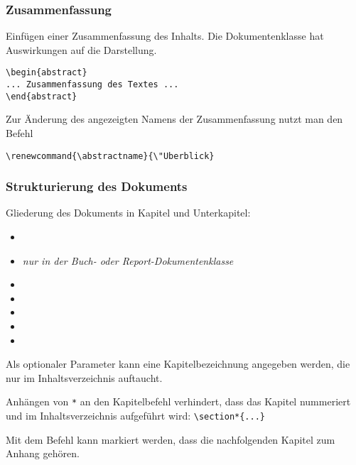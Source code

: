 \begin{frame}[c,fragile]
\frametitle{Zusammenfassung}

Einf\"ugen einer Zusammenfassung des Inhalts. Die Dokumentenklasse hat Auswirkungen auf die Darstellung.

\begin{block}{}
\begin{verbatim}
\begin{abstract}
... Zusammenfassung des Textes ...
\end{abstract}
\end{verbatim}
\end{block}

Zur \"Anderung des angezeigten Namens der Zusammenfassung nutzt man den Befehl
\begin{verbatim}\renewcommand{\abstractname}{\"Uberblick}\end{verbatim}

\end{frame}

\begin{frame}[c,fragile]
\frametitle{Strukturierung des Dokuments}

Gliederung des Dokuments in Kapitel und Unterkapitel:
\begin{itemize}
\item {}
\item {} \emph{nur in der Buch- oder Report-Dokumentenklasse}
\item {}
\item {}
\item {}
\item {}
\item {}
\end{itemize}

Als optionaler Parameter kann eine Kapitelbezeichnung angegeben werden, die nur im Inhaltsverzeichnis auftaucht.

Anh\"angen von \verb|*| an den Kapitelbefehl verhindert, dass das Kapitel nummeriert und im Inhaltsverzeichnis aufgef\"uhrt wird:
\verb|\section*{...}|

Mit dem Befehl  kann markiert werden, dass die nachfolgenden Kapitel zum Anhang gehören.
\end{frame}

